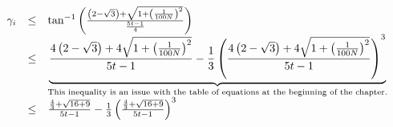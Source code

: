 \begin{equation}\label{eqn:gammaBound}
\begin{array}{rcl}
\gamma_i & \leq & \tan^{-1} \left( 
								\frac{\left( 2 - \sqrt{3} \right) + \sqrt{1 + \left( \frac{1}{100N} \right)^2}	}
									 {	\frac{5t -1}{4}	}
								 \right)\\
		& \leq & \underbrace{\frac{
						4 \left( 2 - \sqrt{3} \right) + 4\sqrt{1 + \left( \frac{1}{100N} \right)^2}	}
					  {	
					  	5t -1	
					  } - \frac{1}{3} \left( 
										  	\frac{
											4 \left( 2 - \sqrt{3} \right) + 4\sqrt{1 + \left( \frac{1}{100N} \right)^2}	}
										  {	
										  	5t -1	
										  }
							  			 \right)^3}_{\text{This inequality is an issue with the table of equations at the beginning of the chapter.}}\\
	  & \leq & \frac{
						\frac{4}{3} + \sqrt{16 + 9}	}
					  {	
					  	5t -1	
					  } - \frac{1}{3} \left( 
										  	\frac{
													\frac{4}{3} + \sqrt{16 + 9}	}
												  {	
												  	5t -1	
												  }
										   \right)^3\\


\end{array}
\end{equation}
